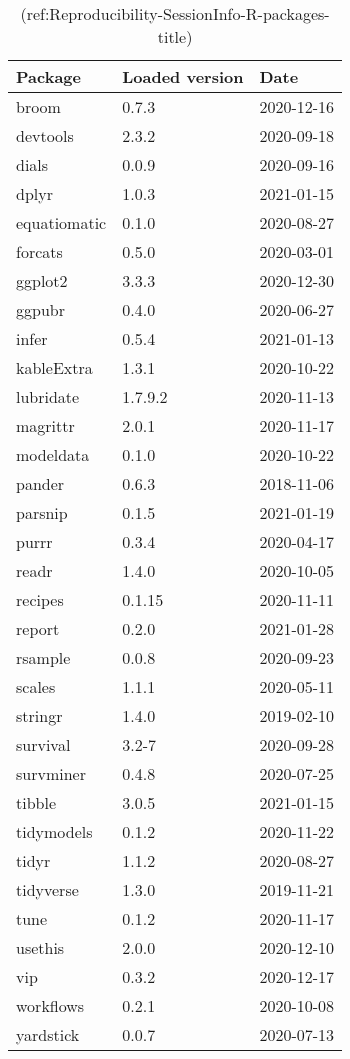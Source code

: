 \begin{table}

\caption[ ]{(ref:Reproducibility-SessionInfo-R-packages-title)}
\centering
\begin{tabular}[t]{lll}
\toprule
Package & Loaded version & Date\\
\midrule
broom & 0.7.3 & 2020-12-16\\
devtools & 2.3.2 & 2020-09-18\\
dials & 0.0.9 & 2020-09-16\\
dplyr & 1.0.3 & 2021-01-15\\
equatiomatic & 0.1.0 & 2020-08-27\\
\addlinespace
forcats & 0.5.0 & 2020-03-01\\
ggplot2 & 3.3.3 & 2020-12-30\\
ggpubr & 0.4.0 & 2020-06-27\\
infer & 0.5.4 & 2021-01-13\\
kableExtra & 1.3.1 & 2020-10-22\\
\addlinespace
lubridate & 1.7.9.2 & 2020-11-13\\
magrittr & 2.0.1 & 2020-11-17\\
modeldata & 0.1.0 & 2020-10-22\\
pander & 0.6.3 & 2018-11-06\\
parsnip & 0.1.5 & 2021-01-19\\
\addlinespace
purrr & 0.3.4 & 2020-04-17\\
readr & 1.4.0 & 2020-10-05\\
recipes & 0.1.15 & 2020-11-11\\
report & 0.2.0 & 2021-01-28\\
rsample & 0.0.8 & 2020-09-23\\
\addlinespace
scales & 1.1.1 & 2020-05-11\\
stringr & 1.4.0 & 2019-02-10\\
survival & 3.2-7 & 2020-09-28\\
survminer & 0.4.8 & 2020-07-25\\
tibble & 3.0.5 & 2021-01-15\\
\addlinespace
tidymodels & 0.1.2 & 2020-11-22\\
tidyr & 1.1.2 & 2020-08-27\\
tidyverse & 1.3.0 & 2019-11-21\\
tune & 0.1.2 & 2020-11-17\\
usethis & 2.0.0 & 2020-12-10\\
\addlinespace
vip & 0.3.2 & 2020-12-17\\
workflows & 0.2.1 & 2020-10-08\\
yardstick & 0.0.7 & 2020-07-13\\
\bottomrule
\end{tabular}
\end{table}
